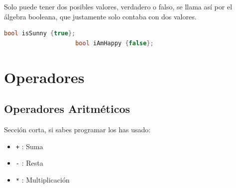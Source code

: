 \documentclass[12pt, fleqn]{report}                             %
\theoremstyle{break}                                            %
\newcommand{\textCode}[1]  { \texttt{#1} }                      %
\begin{document}
                Solo puede tener dos posibles valores, verdadero o falso, se llama así por el álgebra
                booleana, que justamente solo contaba con dos valores.
                \begin{lstlisting}[language=C++, gobble=20]
                    bool isSunny {true};
                    bool iAmHappy {false};
                \end{lstlisting}


        \clearpage
        \section{Operadores}

            \subsection{Operadores Aritméticos}

                Sección corta, si sabes programar los has usado:

                \begin{itemize}
                    \item \textCode{+}: Suma
                    \item \textCode{-}: Resta
                    \item \textCode{*}: Multiplicación
                \end{itemize}
\end{document}
